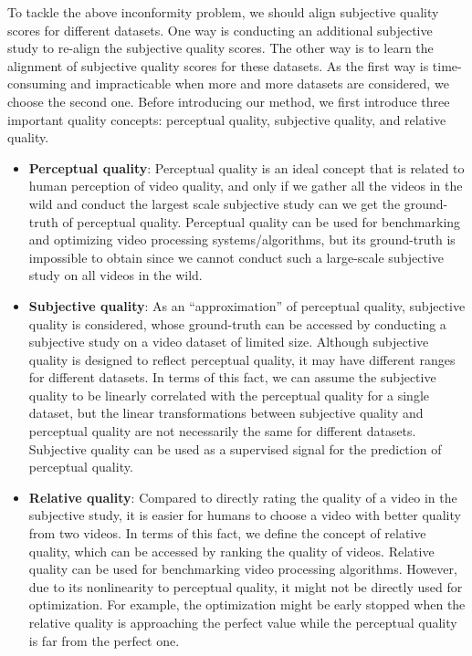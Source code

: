 \documentclass[twocolumn]{svjour3}          \smartqed  \usepackage{graphicx}
\begin{document}
To tackle the above inconformity problem, we should align subjective quality scores for different datasets.
One way is conducting an additional subjective study to re-align the subjective quality scores.
The other way is to learn the alignment of subjective quality scores for these datasets.
As the first way is time-consuming and impracticable when more and more datasets are considered, we choose the second one.
Before introducing our method, we first introduce three important quality concepts: perceptual quality, subjective quality, and relative quality. 
\begin{itemize}
\item[] \textbf{Perceptual quality}: Perceptual quality is an ideal concept that is related to human perception of video quality, and only if we gather all the videos in the wild and conduct the largest scale subjective study can we get the ground-truth of perceptual quality.
Perceptual quality can be used for benchmarking and optimizing video processing systems/algorithms, but its ground-truth is impossible to obtain since we cannot conduct such a large-scale subjective study on all videos in the wild.
\vspace{2mm}
\item[] \textbf{Subjective quality}: As an ``approximation'' of perceptual quality, subjective quality is considered, whose ground-truth can be accessed by conducting a subjective study on a video dataset of limited size.
Although subjective quality is designed to reflect perceptual quality, it may have different ranges for different datasets.
In terms of this fact, we can assume the subjective quality to be linearly correlated with the perceptual quality for a single dataset, but the linear transformations between subjective quality and perceptual quality are not necessarily the same for different datasets.
Subjective quality can be used as a supervised signal for the prediction of perceptual quality.
\vspace{2mm}
\item[] \textbf{Relative quality}: Compared to directly rating the quality of a video in the subjective study, it is easier for humans to choose a video with better quality from two videos.
In terms of this fact, we define the concept of relative quality, which can be accessed by ranking the quality of videos.
Relative quality can be used for benchmarking video processing algorithms.
However, due to its nonlinearity to perceptual quality, it might not be directly used for optimization.
For example, the optimization might be early stopped when the relative quality is approaching the perfect value while the perceptual quality is far from the perfect one.
\end{itemize}
\end{document}

